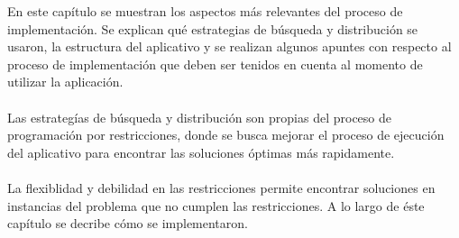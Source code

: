 En este capítulo se muestran los aspectos más relevantes del proceso de implementación. Se explican qué estrategias de búsqueda y distribución se usaron, la estructura del aplicativo y se realizan algunos apuntes con respecto al proceso de implementación que deben ser tenidos en cuenta al momento de utilizar la aplicación.
\\\\
Las estrategías de búsqueda y distribución son propias del proceso de programación por restricciones, donde se busca mejorar el proceso de ejecución del aplicativo para encontrar las soluciones óptimas más rapidamente. 
\\\\
La flexiblidad y debilidad en las restricciones permite encontrar soluciones en instancias del problema que no cumplen las restricciones. A lo largo de éste capítulo se decribe cómo se implementaron.
